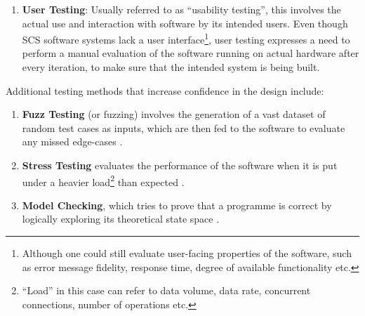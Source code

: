 \documentclass[a4paper,nobib,justified,final]{tufte-book}
\begin{document}
\begin{enumerate}
	As such, in practice, developers create a limited number of test-cases that aim to evaluate the most likely and representative states of the software, with the goal of increasing statement and branch coverage of the source code. Additional techniques used to cover potentially invalid states include edge-case testing and regression testing. For complex software, test-cases evaluate code modules at low (unit) or high (integration) levels \autocite{myersArtSoftwareTesting2012}.

	Nevertheless, various approaches are often used in academia and industry to increase software reliability through different methods of formal verification, with examples being Ada's SPARK \autocite{SPARKReferenceManual}, Frama-C for C \autocite{kirchnerFramaCSoftwareAnalysis2015} and Prusti for Rust \autocite{astrauskasLeveragingRustTypes2019}. However, the complexity and effort required with applying these methods prevents their direct application to entire space systems \autocite{jacklinSurveyVerificationValidation2015}.

	\item \textbf{User Testing}: Usually referred to as ``usability testing'', this involves the actual use and interaction with software by its intended users. Even though \acs{SCS} software systems lack a user interface\footnote{Although one could still evaluate user-facing properties of the software, such as error message fidelity, response time, degree of available functionality etc.}, user testing expresses a need to perform a manual evaluation of the software running on actual hardware after every iteration, to make sure that the intended system is being built.
\end{enumerate}

Additional testing methods that increase confidence in the design include:
\begin{enumerate}
	\item \textbf{Fuzz Testing} (or fuzzing) involves the generation of a vast dataset of random test cases as inputs, which are then fed to the software to evaluate any missed edge-cases \autocite{godefroidAutomatedWhiteboxFuzz2008}.
	\item \textbf{Stress Testing} evaluates the performance of the software when it is put under a heavier load\footnote{``Load'' in this case can refer to data volume, data rate, concurrent connections, number of operations etc.} than expected \autocite{myersArtSoftwareTesting2012}.
	\item \textbf{Model Checking}, which tries to prove that a programme is correct by logically exploring its theoretical state space \autocite{beyerSoftwareVerificationTesting2017}.
\end{enumerate}
\end{document}
